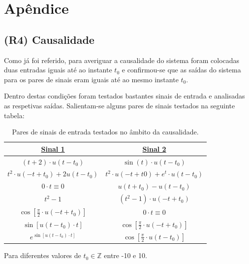 \section{Apêndice}
\renewcommand{\thefigure}{A\arabic{figure}}
\renewcommand{\thetable}{A\arabic{table}}
\setcounter{figure}{0}
\subsection{(R4) Causalidade} %

Como já foi referido, para averiguar a causalidade do sistema foram colocadas duas entradas iguais até ao instante \(t_0\) e confirmou-se que as saídas do sistema para os pares de sinais eram iguais até ao mesmo instante \(t_0\).

Dentro destas condições foram testados bastantes sinais de entrada e analisadas as respetivas saídas. Salientam-se alguns pares de sinais testados na seguinte tabela: 

\begin{table}[h!]
\caption{Pares de sinais de entrada testados no âmbito da causalidade.}
\label{tab:table1}
\centering
    \begin{tabular}{||c | c||} 
        \hline
        \underline{\textbf{Sinal 1}} & \underline{\textbf{Sinal 2}} \\ [0.5ex] 
        \hline\hline
        \((t+2) \cdot u(t-t_0)\) & \(\sin(t) \cdot u(t-t_0)\) \\ [0.5ex]
        \hline
        \(t^2 \cdot u(-t+t_0) + 2u(t-t_0)\) & \(t^2 \cdot u(-t+t0)+e^t \cdot u(t-t_0)\) \\ [0.5ex]
        \hline
        \(0 \cdot t \equiv 0\) & \(u(t+t_0)-u(t-t_0)\) \\ [0.5ex]
        \hline
        \(t^2-1\) & \((t^2-1) \cdot u(-t+t_0)\) \\ [0.5ex]
        \hline
        \(\cos[\frac{\pi}{2} \cdot u(-t+t_0)]\) & \(0 \cdot t \equiv 0 \) \\ [0.5ex] 
        \hline
        \(\sin[u(t-t_0) \cdot t]\) & \(\cos[\frac{\pi}{2} \cdot u(-t+t_0)]\) \\ [0.5ex]
        \hline
        \(e^{\sin[u(t-t_0) \cdot t]}\) & \(\cos[\frac{\pi}{2} \cdot u(t-t_0)]\) \\ [0.5ex]
        \hline
    \end{tabular}
\end{table}

Para diferentes valores de \(t_0 \in \mathbb{Z}\) entre -10 e 10.

